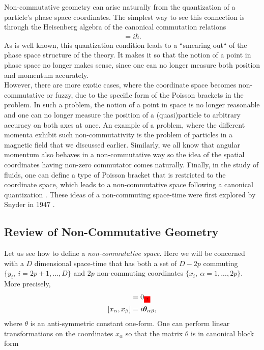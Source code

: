     Non-commutative geometry can arise naturally from the quantization of a particle's phase space coordinates. The simplest way to see this connection is through the Heisenberg algebra of the canonical commutation relations\colorbox{red}{ }
    \begin{align}
        [\hat{x}, \hat{p}] = i \hbar.
    \end{align}
    As is well known, this quantization condition leads to a ``smearing out`` of the phase space structure of the theory. It makes it so that the notion of a point in phase space no longer makes sense, since one can no longer measure both position and momentum accurately. \\
    \indent However, there are more exotic cases, where the coordinate space becomes non-commutative or fuzzy, due to the specific form of the Poisson brackets in the problem. In such a problem, the notion of a point in space is no longer reasonable and one can no longer measure the position of a (quasi)particle to arbitrary accuracy on both axes at once. An example of a problem, where the different momenta exhibit such non-commutativity is the problem of particles in a magnetic field that we discussed earlier. Similarly, we all know that angular momentum also behaves in a non-commutative way so the idea of the spatial coordinates having non-zero commutator comes naturally. Finally, in the study of fluids, one can define a type of Poisson bracket that is restricted to the coordinate space, which leads to a non-commutative space following a canonical quantization \cite{Jackiw:2002pn}. These ideas of a non-commuting space-time were first explored by Snyder in 1947 \cite{Snyder1947_space_time, Snyder1947_EM}.


    \subsection{Review of Non-Commutative Geometry}
    Let us see how to define a \textit{non-commutative space}. Here we will be concerned with a $D$ dimensional space-time that has both a set of $D-2p$ commuting $\{ y_i, \ i=2p+1,...,D\}$ and $2p$ non-commuting coordinates $\{ x_i, \ \alpha =1,...,2p\}$. More precisely,
    \begin{align}
        [y_i, y_j] &=0\colorbox{red}{,}\\
        [x_{\alpha}, x_{\beta}] &=i \bm{\theta}_{\alpha \beta}, \label{eq:space_time_commutations}
    \end{align}
    where $\theta$ is an anti-symmetric constant one-form. One can perform linear transformations on the coordinates $x_{\alpha}$ so that the matrix $\theta$ is in canonical block form

